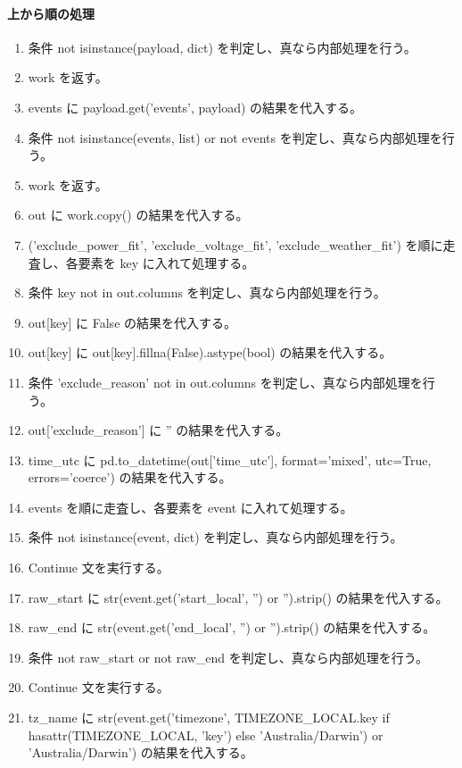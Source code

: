 \documentclass[a4paper,11pt]{article}
\begin{document}
            \paragraph{上から順の処理}
            \begin{enumerate}[leftmargin=1.8em]
            \item 条件 not isinstance(payload, dict) を判定し、真なら内部処理を行う。
\item   work を返す。
\item events に payload.get('events', payload) の結果を代入する。
\item 条件 not isinstance(events, list) or not events を判定し、真なら内部処理を行う。
\item   work を返す。
\item out に work.copy() の結果を代入する。
\item ('exclude\_power\_fit', 'exclude\_voltage\_fit', 'exclude\_weather\_fit') を順に走査し、各要素を key に入れて処理する。
\item   条件 key not in out.columns を判定し、真なら内部処理を行う。
\item     out[key] に False の結果を代入する。
\item   out[key] に out[key].fillna(False).astype(bool) の結果を代入する。
\item 条件 'exclude\_reason' not in out.columns を判定し、真なら内部処理を行う。
\item   out['exclude\_reason'] に '' の結果を代入する。
\item time\_utc に pd.to\_datetime(out['time\_utc'], format='mixed', utc=True, errors='coerce') の結果を代入する。
\item events を順に走査し、各要素を event に入れて処理する。
\item   条件 not isinstance(event, dict) を判定し、真なら内部処理を行う。
\item     Continue 文を実行する。
\item   raw\_start に str(event.get('start\_local', '') or '').strip() の結果を代入する。
\item   raw\_end に str(event.get('end\_local', '') or '').strip() の結果を代入する。
\item   条件 not raw\_start or not raw\_end を判定し、真なら内部処理を行う。
\item     Continue 文を実行する。
\item   tz\_name に str(event.get('timezone', TIMEZONE\_LOCAL.key if hasattr(TIMEZONE\_LOCAL, 'key') else 'Australia/Darwin') or 'Australia/Darwin') の結果を代入する。

\end{enumerate}
\end{document}
